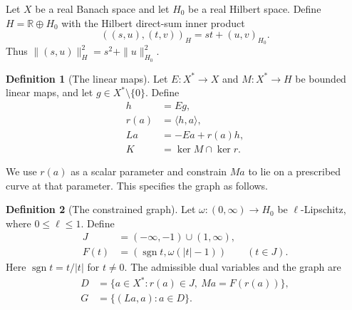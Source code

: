 \documentclass[11pt]{article}
\newcommand{\R}{\mathbb R}
\newcommand{\sgn}{\operatorname{sgn}}
\newcommand{\pair}[2]{\langle #1,#2\rangle}
\theoremstyle{definition}
\newtheorem{definition}{Definition}
\theoremstyle{remark}
\begin{document}




Let $X$ be a real Banach space and let $H_0$ be a real Hilbert space. Define $H=\R\oplus H_0$ with the Hilbert direct-sum inner product
\[
((s,u),(t,v))_H=st+(u,v)_{H_0}.
\]
Thus $\|(s,u)\|_H^2=s^2+\|u\|_{H_0}^2$.

\begin{definition}[The linear maps]
\label{def:construction-maps}
Let $E:X^*\to X$ and $M:X^*\to H$ be bounded linear maps, and let $g\in X^*\setminus\{0\}$. Define
\[
\begin{aligned}
h&=Eg,\\
r(a)&=\pair{h}{a},\\
La&=-Ea+r(a)h,\\
K&=\ker M\cap\ker r.
\end{aligned}
\]
\end{definition}

We use $r(a)$ as a scalar parameter and constrain $Ma$ to lie on a prescribed curve at that parameter. This specifies the graph as follows.

\begin{definition}[The constrained graph]
\label{def:construction-graph}
Let $\omega:(0,\infty)\to H_0$ be $\ell$-Lipschitz, where $0\le\ell\le1$. Define
\[
\begin{aligned}
J&=(-\infty,-1)\cup(1,\infty),\\
F(t)&=(\sgn t,\omega(|t|-1))\qquad(t\in J).
\end{aligned}
\]
Here $\sgn t=t/|t|$ for $t\ne0$. The admissible dual variables and the graph are
\begin{equation}
\begin{aligned}
D&=\{a\in X^*:r(a)\in J,\ Ma=F(r(a))\},\\
G&=\{(La,a):a\in D\}.
\end{aligned}
\label{eq:abs-full-graph}
\end{equation}
\end{definition}
\end{document}
